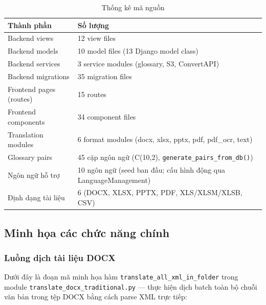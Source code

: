 \begin{table}[H]
\centering
\caption{Thống kê mã nguồn}
\label{tab:codestats}
\renewcommand{\arraystretch}{1.3}
\begin{tabularx}{\textwidth}{|l|X|}
\hline
\textbf{Thành phần}     & \textbf{Số lượng} \\
\hline
Backend views           & 12 view files \\
\hline
Backend models          & 10 model files (13 Django model class) \\
\hline
Backend services        & 3 service modules (glossary, S3, ConvertAPI) \\
\hline
Backend migrations      & 35 migration files \\
\hline
Frontend pages (routes) & 15 routes \\
\hline
Frontend components     & 34 component files \\
\hline
Translation modules     & 6 format modules (docx, xlsx, pptx, pdf, pdf\_ocr, text) \\
\hline
Glossary pairs          & 45 cặp ngôn ngữ (C(10,2), \texttt{generate\_pairs\_from\_db()}) \\
\hline
Ngôn ngữ hỗ trợ         & 10 ngôn ngữ (seed ban đầu; cấu hình động qua LanguageManagement) \\
\hline
Định dạng tài liệu      & 6 (DOCX, XLSX, PPTX, PDF, XLS/XLSM/XLSB, CSV) \\
\hline
\end{tabularx}
\end{table}

\subsection{Minh họa các chức năng chính}

\subsubsection{Luồng dịch tài liệu DOCX}

Dưới đây là đoạn mã minh họa hàm \texttt{translate\_all\_xml\_in\_folder} trong module
\texttt{translate\_docx\_traditional.py} --- thực hiện dịch batch toàn bộ chuỗi văn bản trong
tệp DOCX bằng cách parse XML trực tiếp:

